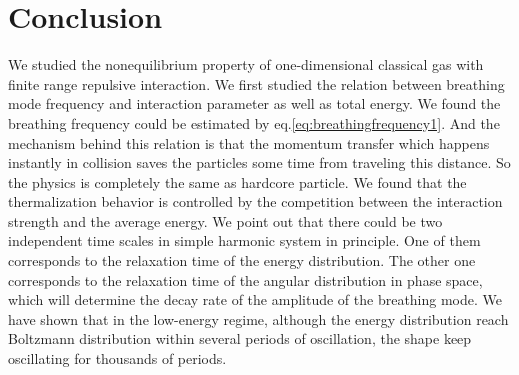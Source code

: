 \documentclass[aps,preprintnumbers,onecolumn,amsmath,amssymb,floatfix,pra]{revtex4-1}
\begin{document}
\section{Conclusion}
We studied the nonequilibrium property of one-dimensional classical gas with finite range repulsive interaction. We first studied the relation between breathing mode frequency and interaction parameter as well as total energy. We found the breathing frequency could be estimated by eq.\ref{eq:breathingfrequency1}. And the mechanism behind this relation is that the momentum transfer which happens instantly in collision saves the particles some time from traveling this distance. So the physics is completely the same as hardcore particle.
We found that the thermalization behavior is controlled by the competition between the interaction strength and the average energy. We point out that there could be two independent time scales in simple harmonic system in principle. One of them corresponds to the relaxation time of the energy distribution. The other one corresponds to the relaxation time of the angular distribution in phase space, which will determine the decay rate of the amplitude of the breathing mode. We have shown that in the low-energy regime, although the energy distribution reach Boltzmann distribution within several periods of oscillation, the shape keep oscillating for thousands of periods.



\end{document}
